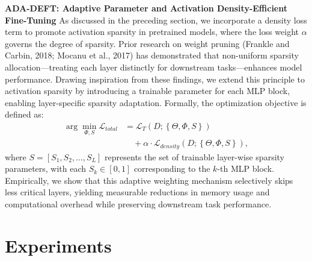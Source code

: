 \documentclass[11pt,a4paper]{article}
\begin{document}
\textbf{ADA-DEFT: Adaptive Parameter and Activation Density-Efficient Fine-Tuning} As discussed in the preceding section, we incorporate a density loss term to promote activation sparsity in pretrained models, where the loss weight \(\alpha\) governs the degree of sparsity. Prior research on weight pruning (Frankle and Carbin, 2018; Mocanu et al., 2017) has demonstrated that non-uniform sparsity allocation—treating each layer distinctly for downstream tasks—enhances model performance. Drawing inspiration from these findings, we extend this principle to activation sparsity by introducing a trainable parameter for each MLP block, enabling layer-specific sparsity adaptation. Formally, the optimization objective is defined as:
\[\begin{aligned}
\arg\min_{\Phi,S}\mathcal{L}_{total} &= \mathcal{L}_{T}\left(D;\left\{\Theta,\Phi,S\right\}\right) \\
&\quad + \alpha \cdot \mathcal{L}_{density}\left(D;\left\{\Theta,\Phi,S\right\}\right),
\end{aligned}\]
where \(S = [S_{1}, S_{2}, \ldots, S_{L}]\) represents the set of trainable layer-wise sparsity parameters, with each \(S_{k} \in [0, 1]\) corresponding to the \(k\)-th MLP block. Empirically, we show that this adaptive weighting mechanism selectively skips less critical layers, yielding measurable reductions in memory usage and computational overhead while preserving downstream task performance.




\section{Experiments}
\end{document}
